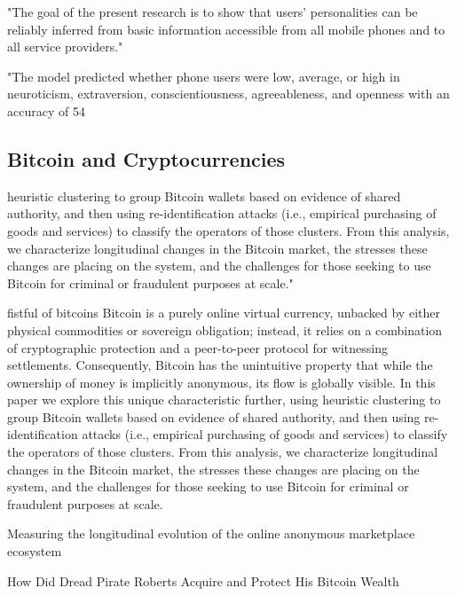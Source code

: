 "The goal of the present research is to show that users’ personalities can be reliably inferred from basic information accessible from all mobile phones and to all service providers."


"The model predicted whether phone users were low, average, or high in neuroticism, extraversion, conscientiousness, agreeableness, and openness with an accuracy of 54%


\subsection{Bitcoin and Cryptocurrencies}


 heuristic clustering to group Bitcoin wallets based on evidence of shared authority, and then using re-identification attacks (i.e., empirical purchasing of goods and services) to classify the operators of those clusters. From this analysis, we characterize longitudinal changes in the Bitcoin market, the stresses these changes are placing on the system, and the challenges for those seeking to use Bitcoin for criminal or fraudulent purposes at scale." 
\cite{meiklejohn2013fistful}

fistful of bitcoins
Bitcoin is a purely online virtual currency, unbacked by either physical commodities or sovereign obligation; instead, it relies on a combination of cryptographic protection and a peer-to-peer protocol for witnessing settlements. Consequently, Bitcoin has the unintuitive property that while the ownership of money is implicitly anonymous, its flow is globally visible. In this paper we explore this unique characteristic further, using heuristic clustering to group Bitcoin wallets based on evidence of shared authority, and then using re-identification attacks (i.e., empirical purchasing of goods and services) to classify the operators of those clusters. From this analysis, we characterize longitudinal changes in the Bitcoin market, the stresses these changes are placing on the system, and the challenges for those seeking to use Bitcoin for criminal or fraudulent purposes at scale.

\cite{soska2015measuring}
Measuring the longitudinal evolution of the online anonymous marketplace ecosystem

\cite{ron2014did}
How Did Dread Pirate Roberts Acquire and Protect His Bitcoin Wealth

